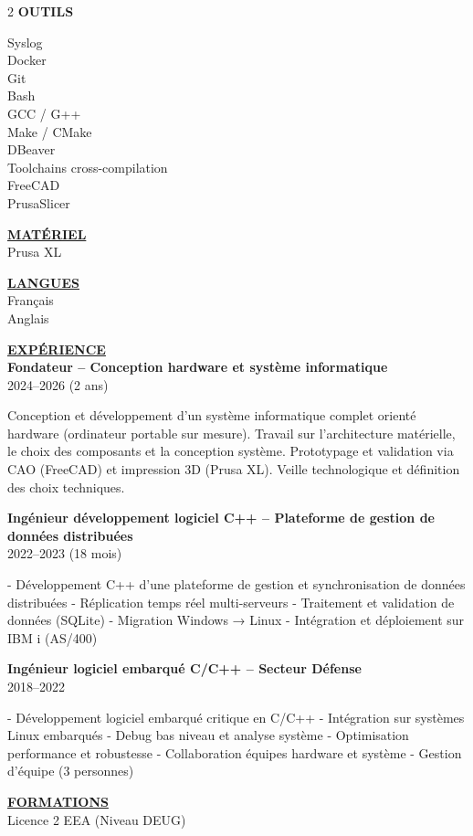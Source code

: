 \documentclass[11pt]{article}
\begin{document}
\begin{paracol}{2}
\textbf{OUTILS}

Syslog \\
Docker \\
Git \\
Bash \\
GCC / G++ \\
Make / CMake \\
DBeaver \\
Toolchains cross-compilation \\
FreeCAD \\
PrusaSlicer

\vspace{3mm}
\underline{\textbf{MATÉRIEL}}\\
Prusa XL

\vspace{5mm}

\underline{\textbf{LANGUES}}\\

Français \\
Anglais


\switchcolumn

\underline{\textbf{EXPÉRIENCE}}\\

\textbf{Fondateur – Conception hardware et système informatique} \\
2024–2026 (2 ans)

Conception et développement d’un système informatique complet orienté hardware (ordinateur portable sur mesure).  
Travail sur l’architecture matérielle, le choix des composants et la conception système.  
Prototypage et validation via CAO (FreeCAD) et impression 3D (Prusa XL).  
Veille technologique et définition des choix techniques.

\vspace{3mm}

\textbf{Ingénieur développement logiciel C++ – Plateforme de gestion de données distribuées} \\
2022–2023 (18 mois)

- Développement C++ d’une plateforme de gestion et synchronisation de données distribuées  
- Réplication temps réel multi-serveurs  
- Traitement et validation de données (SQLite)  
- Migration Windows → Linux  
- Intégration et déploiement sur IBM i (AS/400)

\vspace{3mm}

\textbf{Ingénieur logiciel embarqué C/C++ – Secteur Défense} \\
2018–2022

- Développement logiciel embarqué critique en C/C++  
- Intégration sur systèmes Linux embarqués  
- Debug bas niveau et analyse système  
- Optimisation performance et robustesse  
- Collaboration équipes hardware et système  
- Gestion d’équipe (3 personnes)

\vspace{5mm}

\underline{\textbf{FORMATIONS}}\\

Licence 2 EEA (Niveau DEUG)

\end{paracol}
\end{document}
